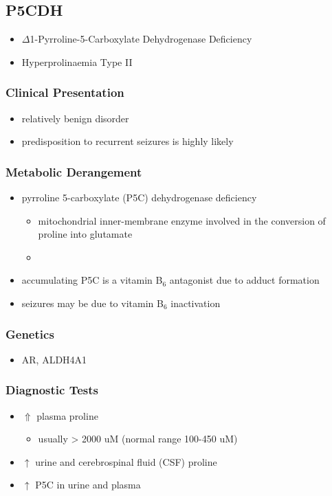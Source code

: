 \documentclass{scrartcl}
\begin{document}
\subsection{P5CDH}
\label{sec:org2e2c56c}
\begin{itemize}
\item \(\Delta\)1-Pyrroline-5-Carboxylate Dehydrogenase Deficiency
\item Hyperprolinaemia Type II
\end{itemize}
\subsubsection{Clinical Presentation}
\label{sec:orgb021392}
\begin{itemize}
\item relatively benign disorder
\item predisposition to recurrent seizures is highly likely
\end{itemize}
\subsubsection{Metabolic Derangement}
\label{sec:orgfa4d85f}
\begin{itemize}
\item pyrroline 5-carboxylate (P5C) dehydrogenase deficiency
\begin{itemize}
\item mitochondrial inner-membrane enzyme involved in the conversion of
proline into glutamate
\item {}
\end{itemize}
\item accumulating P5C is a vitamin B\(_{\text{6}}\) antagonist due to adduct
formation
\item seizures may be due to vitamin B\(_{\text{6}}\) inactivation
\end{itemize}

\subsubsection{Genetics}
\label{sec:orgc6cf3b2}
\begin{itemize}
\item AR, ALDH4A1
\end{itemize}

\subsubsection{Diagnostic Tests}
\label{sec:orgf1b5b69}
\begin{itemize}
\item \(\Uparrow\) plasma proline
\begin{itemize}
\item usually \textgreater{} 2000 uM (normal range 100-450 uM)
\end{itemize}
\item \(\uparrow\) urine and cerebrospinal fluid (CSF) proline
\item \(\uparrow\) P5C in urine and plasma
\end{itemize}
\end{document}

